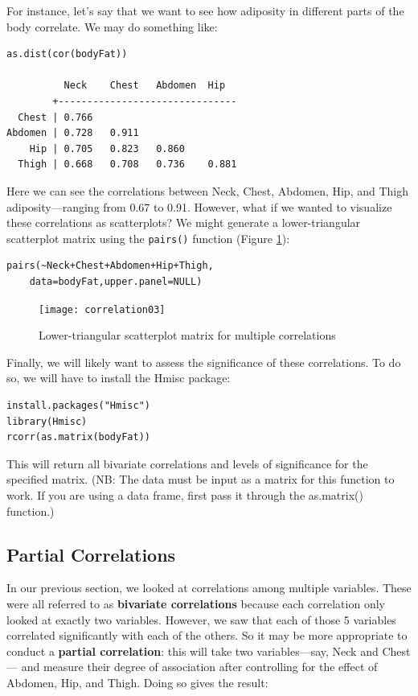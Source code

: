 For instance, let's say that we want to see how adiposity in different parts of the body correlate. We may do something like:

\begin{framed}
\begin{Verbatim}[samepage=TRUE]
as.dist(cor(bodyFat))

          Neck    Chest   Abdomen  Hip
        +-------------------------------
  Chest | 0.766 
Abdomen | 0.728   0.911
    Hip | 0.705   0.823   0.860  
  Thigh | 0.668   0.708   0.736    0.881
\end{Verbatim}
\end{framed}

Here we can see the correlations between Neck, Chest, Abdomen, Hip, and Thigh adiposity---ranging from 0.67 to 0.91. However, what if we wanted to visualize these correlations as scatterplots? We might generate a lower-triangular scatterplot matrix using the \verb|pairs()| function (Figure \ref{fig:correlation03}):

\begin{framed}
\begin{Verbatim}[samepage=TRUE]
pairs(~Neck+Chest+Abdomen+Hip+Thigh,
    data=bodyFat,upper.panel=NULL)
\end{Verbatim}
\end{framed}

\begin{figure}[h]
\texttt{[image: correlation03]}
\label{fig:correlation03}
\caption{Lower-triangular scatterplot matrix for multiple correlations}
\end{figure}

Finally, we will likely want to assess the significance of these correlations. To do so, we will have to install the Hmisc package:

\begin{framed}
\begin{Verbatim}[samepage=TRUE]
install.packages("Hmisc")
library(Hmisc)
rcorr(as.matrix(bodyFat))
\end{Verbatim}
\end{framed}

This will return all bivariate correlations and levels of significance for the specified matrix. (NB: The data must be input as a matrix for this function to work. If you are using a data frame, first pass it through the as.matrix() function.)

\subsection{Partial Correlations}
In our previous section, we looked at correlations among multiple variables. These were all referred to as \textbf{bivariate correlations} because each correlation only looked at exactly two variables. However, we saw that each of those 5 variables correlated significantly with each of the others. So it may be more appropriate to conduct a \textbf{partial correlation}: this will take two variables---say, Neck and Chest--- and measure their degree of association after controlling for the effect of Abdomen, Hip, and Thigh. Doing so gives the result:

